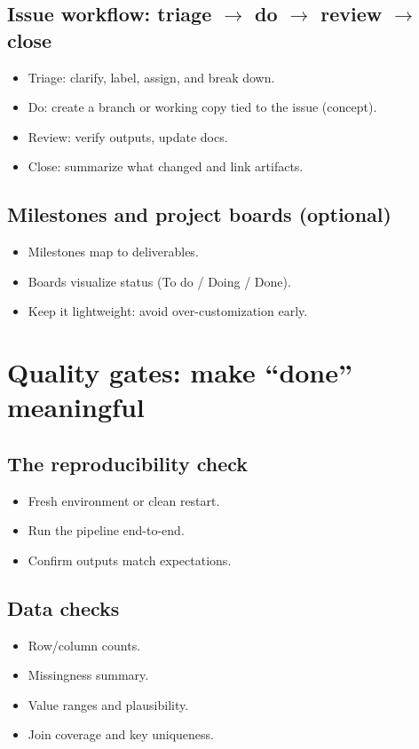 \subsection{Issue workflow: triage $\rightarrow$ do $\rightarrow$ review $\rightarrow$ close}
\begin{itemize}
\item Triage: clarify, label, assign, and break down.
\item Do: create a branch or working copy tied to the issue (concept).
\item Review: verify outputs, update docs.
\item Close: summarize what changed and link artifacts.
\end{itemize}

\subsection{Milestones and project boards (optional)}
\begin{itemize}
\item Milestones map to deliverables.
\item Boards visualize status (To do / Doing / Done).
\item Keep it lightweight: avoid over-customization early.
\end{itemize}

\section{Quality gates: make ``done'' meaningful}
\subsection{The reproducibility check}
\begin{itemize}
\item Fresh environment or clean restart.
\item Run the pipeline end-to-end.
\item Confirm outputs match expectations.
\end{itemize}

\subsection{Data checks}
\begin{itemize}
\item Row/column counts.
\item Missingness summary.
\item Value ranges and plausibility.
\item Join coverage and key uniqueness.
\end{itemize}

